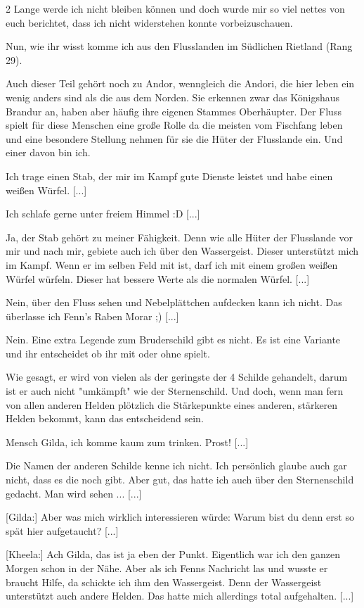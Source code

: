 \documentclass[10pt, a4paper, oneside]{book}
\begin{document}
\begin{multicols}{2}
Lange werde ich nicht bleiben können und doch wurde mir so viel nettes von euch berichtet, dass ich nicht widerstehen konnte vorbeizuschauen.

Nun, wie ihr wisst komme ich aus den Flusslanden im Südlichen Rietland (Rang 29).

Auch dieser Teil gehört noch zu Andor, wenngleich die Andori, die hier leben ein wenig anders sind als die aus dem Norden. Sie erkennen zwar das Königshaus Brandur an, haben aber häufig ihre eigenen Stammes Oberhäupter. Der Fluss spielt für diese Menschen eine große Rolle da die meisten vom Fischfang leben und eine besondere Stellung nehmen für sie die Hüter der Flusslande ein. Und einer davon bin ich.

Ich trage einen Stab, der mir im Kampf gute Dienste leistet und habe einen weißen Würfel. [...]

Ich schlafe gerne unter freiem Himmel :D [...]

Ja, der Stab gehört zu meiner Fähigkeit. Denn wie alle Hüter der Flusslande vor mir und nach mir, gebiete auch ich über den Wassergeist. Dieser unterstützt mich im Kampf. Wenn er im selben Feld mit ist, darf ich mit einem großen weißen Würfel würfeln. Dieser hat bessere Werte als die normalen Würfel. [...]

Nein, über den Fluss sehen und Nebelplättchen aufdecken kann ich nicht. Das überlasse ich Fenn's Raben Morar ;) [...]

Nein. Eine extra Legende zum Bruderschild gibt es nicht. Es ist eine Variante und ihr entscheidet ob ihr mit oder ohne spielt.

Wie gesagt, er wird von vielen als der geringste der 4 Schilde gehandelt, darum ist er auch nicht "umkämpft" wie der Sternenschild. Und doch, wenn man fern von allen anderen Helden plötzlich die Stärkepunkte eines anderen, stärkeren Helden bekommt, kann das entscheidend sein.

Mensch Gilda, ich komme kaum zum trinken. Prost! [...]

Die Namen der anderen Schilde kenne ich nicht. Ich persönlich glaube auch gar nicht, dass es die noch gibt. Aber gut, das hatte ich auch über den Sternenschild gedacht. Man wird sehen ... [...]

[Gilda:] Aber was mich wirklich interessieren würde: Warum bist du denn erst so spät hier aufgetaucht? [...]

[Kheela:] Ach Gilda, das ist ja eben der Punkt. Eigentlich war ich den ganzen Morgen schon in der Nähe. Aber als ich Fenns Nachricht las und wusste er braucht Hilfe, da schickte ich ihm den Wassergeist. Denn der Wassergeist unterstützt auch andere Helden. Das hatte mich allerdings total aufgehalten. [...]


\end{multicols}
\end{document}
